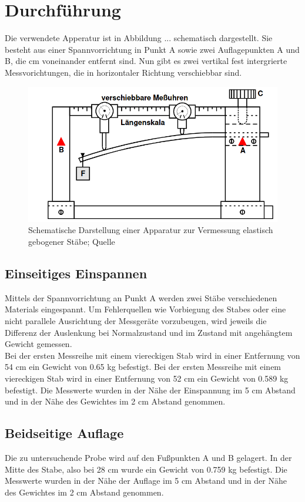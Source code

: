 \section{Durchführung}
\label{sec:Durchführung}

Die verwendete Apperatur ist in Abbildung ... schematisch dargestellt. Sie besteht aus 
einer Spannvorrichtung in Punkt A sowie zwei Auflagepunkten A und B, die %
cm voneinander entfernt sind.
Nun gibt es zwei vertikal fest intergrierte Messvorichtungen, die in horizontaler Richtung 
verschiebbar sind.
\begin{figure}
    \centering
    \includegraphics[scale=0.5]{panierte Austern.png}
    \caption{Schematische Darstellung einer Apparatur zur Vermessung elastisch gebogener Stäbe; Quelle \cite{sample}}
    \label{fig:backfisch}
\end{figure}

\subsection{Einseitiges Einspannen}
    Mittels der Spannvorrichtung an Punkt A werden zwei Stäbe verschiedenen Materials
    eingespannt. Um Fehlerquellen wie Vorbiegung des Stabes oder eine nicht parallele
    Ausrichtung der Messgeräte vorzubeugen, wird jeweils die Differenz der Auslenkung
    bei Normalzustand und im Zustand mit angehängtem Gewicht gemessen.\\
    Bei der ersten Messreihe mit einem viereckigen Stab wird in einer Entfernung von 54
    cm ein Gewicht von 0.65 kg befestigt.
    Bei der ersten Messreihe mit einem viereckigen Stab wird in einer Entfernung von 52
    cm ein Gewicht von 0.589 kg befestigt.
    Die Messwerte wurden in der Nähe der Einspannung im 5 cm Abstand und in der Nähe
    des Gewichtes im 2 cm Abstand genommen.


\subsection{Beidseitige Auflage}
    Die zu untersuchende Probe wird auf den Fußpunkten A und B gelagert. In der Mitte
    des Stabe, also bei 28 cm wurde ein Gewicht von 0.759 kg befestigt.
    Die Messwerte wurden in der Nähe der Auflage im 5 cm Abstand und in der Nähe
    des Gewichtes im 2 cm Abstand genommen.